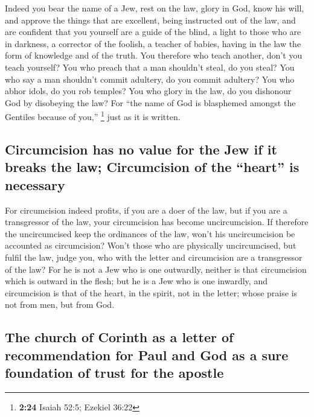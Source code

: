  Indeed you bear the name of a Jew, rest on the law,
glory in God,  know his will, and approve the things that
are excellent, being instructed out of the law,  and are
confident that you yourself are a guide of the blind, a light to those
who are in darkness,  a corrector of the foolish, a
teacher of babies, having in the law the form of knowledge and of the
truth.  You therefore who teach another, don't you teach
yourself? You who preach that a man shouldn't steal, do you steal?
 You who say a man shouldn't commit adultery, do you
commit adultery? You who abhor idols, do you rob temples?
 You who glory in the law, do you dishonour God by
disobeying the law?  For ``the name of God is blasphemed
amongst the Gentiles because of you,'' \footnote{\textbf{2:24} Isaiah
  52:5; Ezekiel 36:22} just as it is written.

\hypertarget{circumcision-has-no-value-for-the-jew-if-it-breaks-the-law-circumcision-of-the-heart-is-necessary}{%
\subsection{Circumcision has no value for the Jew if it breaks the law;
Circumcision of the ``heart'' is
necessary}\label{circumcision-has-no-value-for-the-jew-if-it-breaks-the-law-circumcision-of-the-heart-is-necessary}}

 For circumcision indeed profits, if you are a doer of
the law, but if you are a transgressor of the law, your circumcision has
become uncircumcision.  If therefore the uncircumcised
keep the ordinances of the law, won't his uncircumcision be accounted as
circumcision?  Won't those who are physically
uncircumcised, but fulfil the law, judge you, who with the letter and
circumcision are a transgressor of the law?  For he is
not a Jew who is one outwardly, neither is that circumcision which is
outward in the flesh;  but he is a Jew who is one
inwardly, and circumcision is that of the heart, in the spirit, not in
the letter; whose praise is not from men, but from God.

\hypertarget{the-church-of-corinth-as-a-letter-of-recommendation-for-paul-and-god-as-a-sure-foundation-of-trust-for-the-apostle}{%
\subsection{The church of Corinth as a letter of recommendation for Paul
and God as a sure foundation of trust for the
apostle}\label{the-church-of-corinth-as-a-letter-of-recommendation-for-paul-and-god-as-a-sure-foundation-of-trust-for-the-apostle}}

